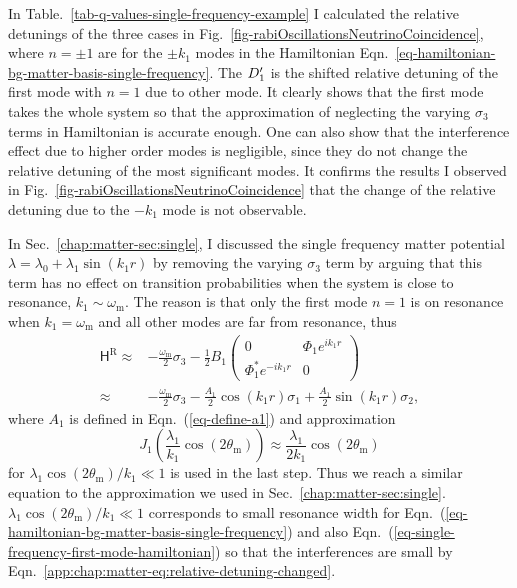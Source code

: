 In Table.~\ref{tab-q-values-single-frequency-example} I calculated the relative detunings of the three cases in Fig.~\ref{fig-rabiOscillationsNeutrinoCoincidence}, where $n=\pm 1$ are for the $\pm k_1$ modes in the Hamiltonian Eqn.~\ref{eq-hamiltonian-bg-matter-basis-single-frequency}. The $D'_1$ is the shifted relative detuning of the first mode with $n=1$ due to other mode. It clearly shows that the first mode takes the whole system so that the approximation of neglecting the varying $\sigma_3$ terms in Hamiltonian is accurate enough. One can also show that the interference effect due to higher order modes is negligible, since they do not change the relative detuning of the most significant modes. It confirms the results I observed in Fig.~\ref{fig-rabiOscillationsNeutrinoCoincidence} that the change of the relative detuning due to the $-k_1$ mode is not observable.

In Sec.~\ref{chap:matter-sec:single}, I discussed the single frequency matter potential $\lambda = \lambda_0 + \lambda_1 \sin(k_1 r)$ by removing the varying $\sigma_3$ term by arguing that this term has no effect on transition probabilities when the system is close to resonance, $k_1 \sim \omega_{\mathrm m}$. The reason is that only the first mode $n=1$ is on resonance when $k_1=\omega_{\mathrm m}$ and all other modes are far from resonance, thus
\begin{align}
\mathsf H^{\mathrm R} \approx & -\frac{\omega_{\mathrm m}}{2}\sigma_3 - \frac{1}{2} B_1 \begin{pmatrix}
0 & \Phi_1 e^{i k_1 r} \\
\Phi_1^* e^{-ik_1r} & 0
\end{pmatrix}\label{eq-single-frequency-first-mode-hamiltonian} \\
\approx & -\frac{\omega_{\mathrm m}}{2} \sigma_3 - \frac{A_1}{2} \cos(k_1 r) \sigma_1 + \frac{A_1}{2} \sin(k_1 r) \sigma_2\nonumber,
\end{align}
where $A_1$ is defined in Eqn.~(\ref{eq-define-a1}) and approximation
\begin{equation*}
J_1\left( \frac{\lambda_1}{k_1}\cos (2\theta_{\mathrm m}) \right) \approx \frac{\lambda_1}{2k_1}\cos (2\theta_{\mathrm m})
\end{equation*}
for $\lambda_1\cos(2\theta_{\mathrm m})/k_1\ll 1$ is used in the last step. Thus we reach a similar equation to the approximation we used in Sec.~\ref{chap:matter-sec:single}. $\lambda_1\cos(2\theta_{\mathrm m})/k_1\ll 1$ corresponds to small resonance width for Eqn.~(\ref{eq-hamiltonian-bg-matter-basis-single-frequency}) and also Eqn.~(\ref{eq-single-frequency-first-mode-hamiltonian}) so that the interferences are small by Eqn.~\ref{app:chap:matter-eq:relative-detuning-changed}.



